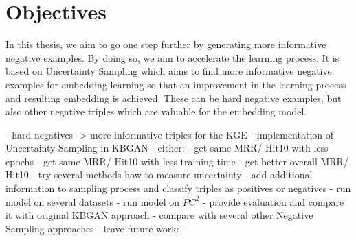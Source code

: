 \section{Objectives}

In this thesis, we aim to go one step further by generating more informative negative examples. 
By doing so, we aim to accelerate the learning process.
It is based on Uncertainty Sampling which aims to find more informative negative examples for embedding learning so that an improvement in the learning process and resulting embedding is achieved.
These can be hard negative examples, but also other negative triples which are valuable for the embedding model.


- hard negatives -> more informative triples for the KGE
- implementation of Uncertainty Sampling in KBGAN
- either: 
    - get same MRR/ Hit\@10 with less epochs
    - get same MRR/ Hit\@10 with less training time
    - get better overall MRR/ Hit\@10
- try several methods how to measure uncertainty
- add additional information to sampling process and classify triples as positives or negatives
- run model on several datasets
- run model on $PC^2$
- provide evaluation and compare it with original KBGAN approach
- compare with several other Negative Sampling approaches
- leave future work: 
    - 